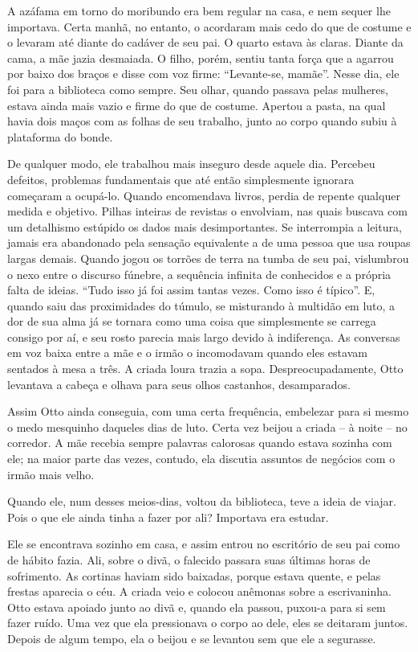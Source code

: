 A azáfama em torno do moribundo era bem regular na casa, e nem sequer
lhe importava. Certa manhã, no entanto, o acordaram mais cedo do que de
costume e o levaram até diante do cadáver de seu pai. O quarto estava às
claras. Diante da cama, a mãe jazia desmaiada. O filho, porém, sentiu
tanta força que a agarrou por baixo dos braços e disse com voz firme:
``Levante-se, mamãe''. Nesse dia, ele foi para a biblioteca como sempre.
Seu olhar, quando passava pelas mulheres, estava ainda mais vazio e
firme do que de costume. Apertou a pasta, na qual havia dois maços com
as folhas de seu trabalho, junto ao corpo quando subiu à plataforma do
bonde.

De qualquer modo, ele trabalhou mais inseguro desde aquele dia. Percebeu
defeitos, problemas fundamentais que até então simplesmente ignorara
começaram a ocupá-lo. Quando encomendava livros, perdia de repente
qualquer medida e objetivo. Pilhas inteiras de revistas o envolviam, nas
quais buscava com um detalhismo estúpido os dados mais desimportantes.
Se interrompia a leitura, jamais era abandonado pela sensação
equivalente a de uma pessoa que usa roupas largas demais. Quando jogou
os torrões de terra na tumba de seu pai, vislumbrou o nexo entre o
discurso fúnebre, a sequência infinita de conhecidos e a própria falta
de ideias. ``Tudo isso já foi assim tantas vezes. Como isso é típico''.
E, quando saiu das proximidades do túmulo, se misturando à multidão em
luto, a dor de sua alma já se tornara como uma coisa que simplesmente se
carrega consigo por aí, e seu rosto parecia mais largo devido à
indiferença. As conversas em voz baixa entre a mãe e o irmão o
incomodavam quando eles estavam sentados à mesa a três. A criada loura
trazia a sopa. Despreocupadamente, Otto levantava a cabeça e olhava para
seus olhos castanhos, desamparados.

Assim Otto ainda conseguia, com uma certa frequência, embelezar para si
mesmo o medo mesquinho daqueles dias de luto. Certa vez beijou a criada
-- à noite -- no corredor. A mãe recebia sempre palavras calorosas
quando estava sozinha com ele; na maior parte das vezes, contudo, ela
discutia assuntos de negócios com o irmão mais velho.

Quando ele, num desses meios-dias, voltou da biblioteca, teve a ideia de
viajar. Pois o que ele ainda tinha a fazer por ali? Importava era
estudar.

Ele se encontrava sozinho em casa, e assim entrou no escritório de seu
pai como de hábito fazia. Ali, sobre o divã, o falecido passara suas
últimas horas de sofrimento. As cortinas haviam sido baixadas, porque
estava quente, e pelas frestas aparecia o céu. A criada veio e colocou
anêmonas sobre a escrivaninha. Otto estava apoiado junto ao divã e,
quando ela passou, puxou-a para si sem fazer ruído. Uma vez que ela
pressionava o corpo ao dele, eles se deitaram juntos. Depois de algum
tempo, ela o beijou e se levantou sem que ele a segurasse.

